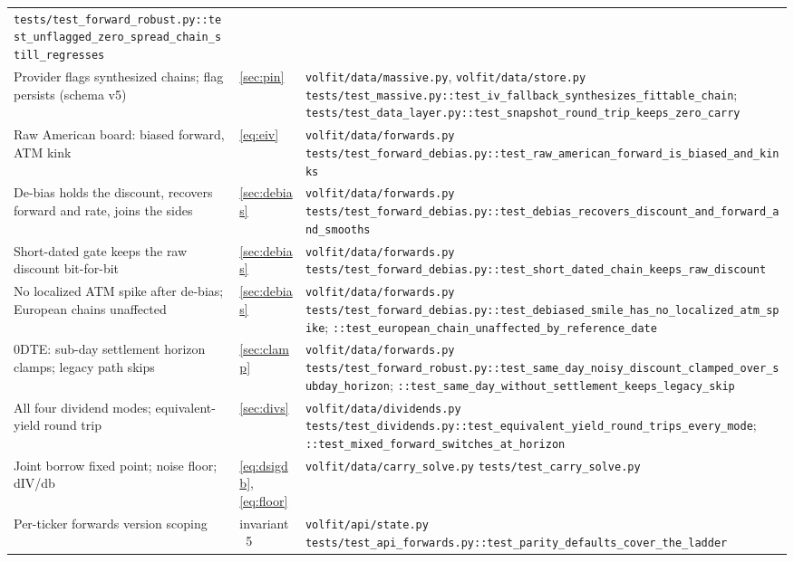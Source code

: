 \documentclass[11pt]{article}
\begin{document}
\begin{longtable}{@{}p{}p{}p{}@{}}
\nolinkurl{tests/test_forward_robust.py::test_unflagged_zero_spread_chain_still_regresses}\\
\addlinespace
Provider flags synthesized chains; flag persists (schema v5) &
\cref{sec:pin} &
\nolinkurl{volfit/data/massive.py}, \nolinkurl{volfit/data/store.py}\newline
\nolinkurl{tests/test_massive.py::test_iv_fallback_synthesizes_fittable_chain};
\nolinkurl{tests/test_data_layer.py::test_snapshot_round_trip_keeps_zero_carry}\\
\addlinespace
Raw American board: biased forward, ATM kink &
\eqref{eq:eiv} &
\nolinkurl{volfit/data/forwards.py}\newline
\nolinkurl{tests/test_forward_debias.py::test_raw_american_forward_is_biased_and_kinks}\\
\addlinespace
De-bias holds the discount, recovers forward and rate, joins the sides &
\cref{sec:debias} &
\nolinkurl{volfit/data/forwards.py}\newline
\nolinkurl{tests/test_forward_debias.py::test_debias_recovers_discount_and_forward_and_smooths}\\
\addlinespace
Short-dated gate keeps the raw discount bit-for-bit &
\cref{sec:debias} &
\nolinkurl{volfit/data/forwards.py}\newline
\nolinkurl{tests/test_forward_debias.py::test_short_dated_chain_keeps_raw_discount}\\
\addlinespace
No localized ATM spike after de-bias; European chains unaffected &
\cref{sec:debias} &
\nolinkurl{volfit/data/forwards.py}\newline
\nolinkurl{tests/test_forward_debias.py::test_debiased_smile_has_no_localized_atm_spike};
\nolinkurl{::test_european_chain_unaffected_by_reference_date}\\
\addlinespace
0DTE: sub-day settlement horizon clamps; legacy path skips &
\cref{sec:clamp} &
\nolinkurl{volfit/data/forwards.py}\newline
\nolinkurl{tests/test_forward_robust.py::test_same_day_noisy_discount_clamped_over_subday_horizon};
\nolinkurl{::test_same_day_without_settlement_keeps_legacy_skip}\\
\addlinespace
All four dividend modes; equivalent-yield round trip &
\cref{sec:divs} &
\nolinkurl{volfit/data/dividends.py}\newline
\nolinkurl{tests/test_dividends.py::test_equivalent_yield_round_trips_every_mode};
\nolinkurl{::test_mixed_forward_switches_at_horizon}\\
\addlinespace
Joint borrow fixed point; noise floor; dIV/db &
\eqref{eq:dsigdb}, \eqref{eq:floor} &
\nolinkurl{volfit/data/carry_solve.py}\newline
\nolinkurl{tests/test_carry_solve.py}\\
\addlinespace
Per-ticker forwards version scoping &
invariant~5 &
\nolinkurl{volfit/api/state.py}\newline
\nolinkurl{tests/test_api_forwards.py::test_parity_defaults_cover_the_ladder}\\
\bottomrule
\end{longtable}
\endgroup
\end{document}
